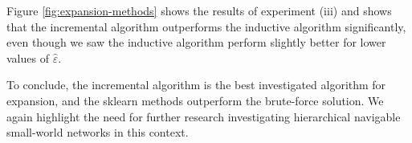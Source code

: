 Figure \ref{fig:expansion-methods} shows the results of experiment (iii) and shows that the incremental algorithm outperforms the inductive algorithm significantly, even though we saw the inductive algorithm perform slightly better for lower values of $\hat\varepsilon$.

To conclude, the incremental algorithm is the best investigated algorithm for expansion, and the sklearn methods outperform the brute-force solution. We again highlight the need for further research investigating hierarchical navigable small-world networks in this context. 



